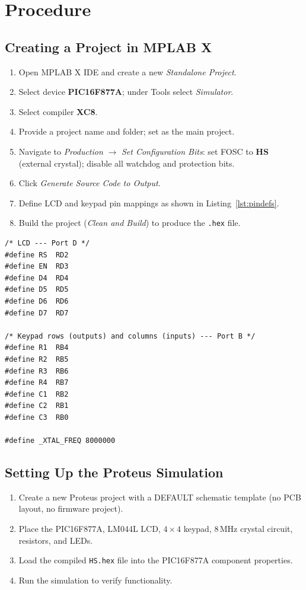 \documentclass[11pt, a4paper]{report}
\begin{document}
\section{Procedure}

\subsection{Creating a Project in MPLAB X}

\begin{enumerate}
    \item Open MPLAB X IDE and create a new \textit{Standalone Project}.
    \item Select device \textbf{PIC16F877A}; under Tools select
          \textit{Simulator}.
    \item Select compiler \textbf{XC8}.
    \item Provide a project name and folder; set as the main project.
    \item Navigate to \textit{Production} $\rightarrow$
          \textit{Set Configuration Bits}: set FOSC to \textbf{HS}
          (external crystal); disable all watchdog and protection bits.
    \item Click \textit{Generate Source Code to Output}.
    \item Define LCD and keypad pin mappings as shown in
          Listing~\ref{lst:pindefs}.
    \item Build the project (\textit{Clean and Build}) to produce the
          \texttt{.hex} file.
\end{enumerate}

\begin{lstlisting}[caption={LCD and keypad pin definitions},
                   label={lst:pindefs}]
/* LCD --- Port D */
#define RS  RD2
#define EN  RD3
#define D4  RD4
#define D5  RD5
#define D6  RD6
#define D7  RD7

/* Keypad rows (outputs) and columns (inputs) --- Port B */
#define R1  RB4
#define R2  RB5
#define R3  RB6
#define R4  RB7
#define C1  RB2
#define C2  RB1
#define C3  RB0

#define _XTAL_FREQ 8000000
\end{lstlisting}

\subsection{Setting Up the Proteus Simulation}

\begin{enumerate}
    \item Create a new Proteus project with a DEFAULT schematic template
          (no PCB layout, no firmware project).
    \item Place the PIC16F877A, LM044L LCD, \(4 \times 4\) keypad, 8\,MHz
          crystal circuit, resistors, and LEDs.
    \item Load the compiled \texttt{HS.hex} file into the PIC16F877A
          component properties.
    \item Run the simulation to verify functionality.
\end{enumerate}
\end{document}
